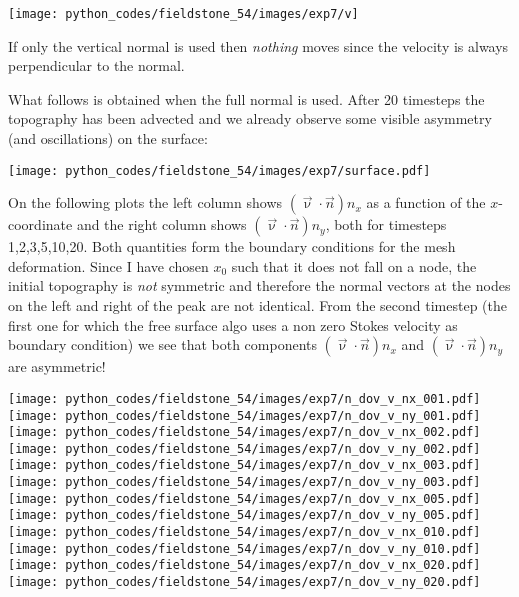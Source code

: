 \begin{center}
\texttt{[image: python\_codes/fieldstone\_54/images/exp7/v]}
\end{center}

If only the vertical normal is used then {\sl nothing} moves since the 
velocity is always perpendicular to the normal. 

What follows is obtained when the full normal is used. 
After 20 timesteps the topography has been advected and we already observe some 
visible asymmetry (and oscillations) on the surface:
\begin{center}
\texttt{[image: python\_codes/fieldstone\_54/images/exp7/surface.pdf]}
\end{center}

On the following plots the left column shows $(\vec{\upnu}\cdot \vec{n})n_x$ 
as a function of the $x$-coordinate and the 
right column shows $(\vec{\upnu}\cdot \vec{n})n_y$, both for timesteps 1,2,3,5,10,20. 
Both quantities form the 
boundary conditions for the mesh deformation.  
Since I have chosen $x_0$ such that it does not fall on a node, the initial 
topography is {\sl not} symmetric and therefore the normal vectors at the nodes 
on the left and right of the peak are not identical. From the second timestep (the first one 
for which the free surface algo uses a non zero Stokes velocity as boundary condition)
we see that both components $(\vec{\upnu}\cdot \vec{n})n_x$ and $(\vec{\upnu}\cdot \vec{n})n_y$ are asymmetric! 


\begin{center}
\texttt{[image: python\_codes/fieldstone\_54/images/exp7/n\_dov\_v\_nx\_001.pdf]}
\texttt{[image: python\_codes/fieldstone\_54/images/exp7/n\_dov\_v\_ny\_001.pdf]}\\
\texttt{[image: python\_codes/fieldstone\_54/images/exp7/n\_dov\_v\_nx\_002.pdf]}
\texttt{[image: python\_codes/fieldstone\_54/images/exp7/n\_dov\_v\_ny\_002.pdf]}\\
\texttt{[image: python\_codes/fieldstone\_54/images/exp7/n\_dov\_v\_nx\_003.pdf]}
\texttt{[image: python\_codes/fieldstone\_54/images/exp7/n\_dov\_v\_ny\_003.pdf]}\\
\texttt{[image: python\_codes/fieldstone\_54/images/exp7/n\_dov\_v\_nx\_005.pdf]}
\texttt{[image: python\_codes/fieldstone\_54/images/exp7/n\_dov\_v\_ny\_005.pdf]}\\
\texttt{[image: python\_codes/fieldstone\_54/images/exp7/n\_dov\_v\_nx\_010.pdf]}
\texttt{[image: python\_codes/fieldstone\_54/images/exp7/n\_dov\_v\_ny\_010.pdf]}\\
\texttt{[image: python\_codes/fieldstone\_54/images/exp7/n\_dov\_v\_nx\_020.pdf]}
\texttt{[image: python\_codes/fieldstone\_54/images/exp7/n\_dov\_v\_ny\_020.pdf]}
\end{center}

